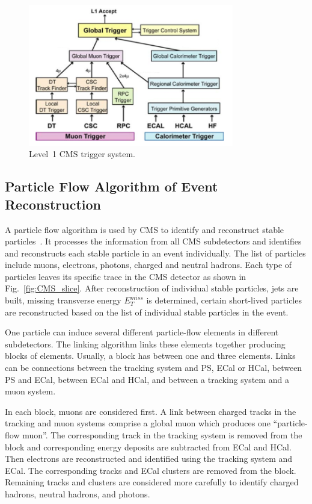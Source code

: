 \begin{figure}[htb]
  \begin{center}
    \includegraphics[width=0.8\textwidth]{../figs/Exp/trigger_L1.png}
    \caption{Level~1 CMS trigger system.}
    \label{fig:trigger_L1}
  \end{center}
\end{figure}

\subsection{Particle Flow Algorithm of Event Reconstruction}

A particle flow algorithm is used by CMS to identify and reconstruct stable particles~\cite{ref_ParticleFlowAlg}. It processes the information from all CMS subdetectors and identifies and reconstructs each stable particle in an event individually. The list of particles include muons, electrons, photons, charged and neutral hadrons. Each type of particles leaves its specific trace in the CMS detector as shown in Fig.~\ref{fig:CMS_slice}. After reconstruction of individual stable particles, jets are built, missing transverse energy $E_T^{miss}$ is determined, certain short-lived particles are reconstructed based on the list of individual stable particles in the event.

One particle can induce several different particle-flow elements in different subdetectors. The linking algorithm links these elements together producing blocks of elements. Usually, a block has between one and three elements. Links can be connections between the tracking system and PS, ECal or HCal, between PS and ECal, between ECal and HCal, and between a tracking system and a muon system. 

In each block, muons are considered first. A link between charged tracks in the tracking and muon systems comprise a global muon which produces one ``particle-flow muon''. The corresponding track in the tracking system is removed from the block and corresponding energy deposits are subtracted from ECal and HCal. Then electrons are reconstructed and identified using the tracking system and ECal. The corresponding tracks and ECal clusters are removed from the block. Remaining tracks and clusters are considered more carefully to identify charged hadrons, neutral hadrons, and photons.

